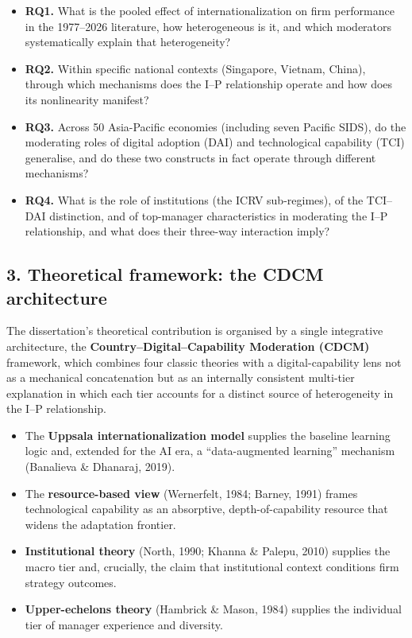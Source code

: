 \documentclass[
  a4paper,
  13pt]{extreport}
\providecommand{\tightlist}{%
  \setlength{\itemsep}{0pt}\setlength{\parskip}{0pt}}
\begin{document}
\begin{itemize}
\tightlist
\item
  \textbf{RQ1.} What is the pooled effect of internationalization on
  firm performance in the 1977--2026 literature, how heterogeneous is
  it, and which moderators systematically explain that heterogeneity?
\item
  \textbf{RQ2.} Within specific national contexts (Singapore, Vietnam,
  China), through which mechanisms does the I--P relationship operate
  and how does its nonlinearity manifest?
\item
  \textbf{RQ3.} Across 50 Asia-Pacific economies (including seven
  Pacific SIDS), do the moderating roles of digital adoption (DAI) and
  technological capability (TCI) generalise, and do these two constructs
  in fact operate through different mechanisms?
\item
  \textbf{RQ4.} What is the role of institutions (the ICRV sub-regimes),
  of the TCI--DAI distinction, and of top-manager characteristics in
  moderating the I--P relationship, and what does their three-way
  interaction imply?
\end{itemize}

\hypertarget{theoretical-framework-the-cdcm-architecture}{%
\subsection{3. Theoretical framework: the CDCM
architecture}\label{theoretical-framework-the-cdcm-architecture}}

The dissertation's theoretical contribution is organised by a single
integrative architecture, the \textbf{Country--Digital--Capability
Moderation (CDCM)} framework, which combines four classic theories with
a digital-capability lens not as a mechanical concatenation but as an
internally consistent multi-tier explanation in which each tier accounts
for a distinct source of heterogeneity in the I--P relationship.

\begin{itemize}
\tightlist
\item
  The \textbf{Uppsala internationalization model} supplies the baseline
  learning logic and, extended for the AI era, a ``data-augmented
  learning'' mechanism (Banalieva \& Dhanaraj, 2019).
\item
  The \textbf{resource-based view} (Wernerfelt, 1984; Barney, 1991)
  frames technological capability as an absorptive, depth-of-capability
  resource that widens the adaptation frontier.
\item
  \textbf{Institutional theory} (North, 1990; Khanna \& Palepu, 2010)
  supplies the macro tier and, crucially, the claim that institutional
  context conditions firm strategy outcomes.
\item
  \textbf{Upper-echelons theory} (Hambrick \& Mason, 1984) supplies the
  individual tier of manager experience and diversity.
\end{itemize}
\end{document}
